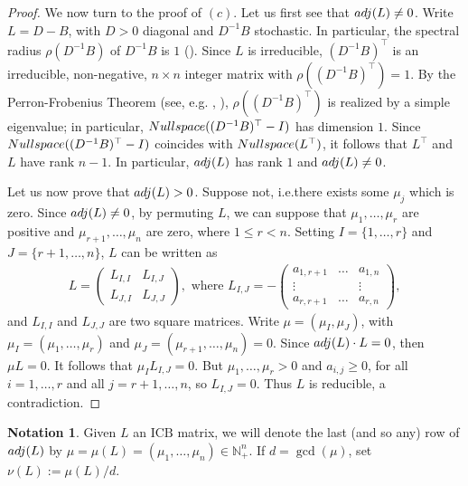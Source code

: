 \documentclass[10pt]{amsart}
\newcommand{\eg}{e.g.}
\newcommand{\ie}{i.e.}
\newcommand{\mbn}{\mbox{$\mathbb{N}$}}
\newcommand{\icb}{\mbox{$\mathrm{ICB}$}}
\newcommand{\I}{\mbox{${\rm I}$}}
\newcommand{\nulls}{\mbox{${\rm Nullspace}$}}
\newcommand{\adj}{\mbox{${\rm adj}$}}
\theoremstyle{definition}
\newtheorem{notation}[cdrthm]{Notation}
\theoremstyle{remark}
\begin{document}
\begin{proof}
We now turn to the proof of $(c)$. Let us first see that $\adj(L)\neq
0$. Write $L=D-B$, with $D>0$ diagonal and $D^{-1}B$ stochastic. In
particular, the spectral radius $\rho(D^{-1}B)$ of $D^{-1}B$ is $1$
(\cite[Chapter~XIII,~p.~83]{gantmacher}). Since $L$ is irreducible,
$(D^{-1}B)^{\top}$ is an irreducible, non-negative, $n\times n$
integer matrix with $\rho((D^{-1}B)^{\top})=1$. By the
Perron-Frobenius Theorem (see, \eg
\cite[Chapter~XIII,~p.~53]{gantmacher},
\cite[Theorem~8.8.1,~p.~178]{gr}), $\rho((D^{-1}B)^{\top})$ is
realized by a simple eigenvalue; in particular,
$\nulls((D^{-1}B)^{\top}-\I)$ has dimension $1$. Since
$\nulls((D^{-1}B)^{\top}-\I)$ coincides with $\nulls(L^{\top})$, it
follows that $L^{\top}$ and $L$ have rank $n-1$. In particular,
$\adj(L)$ has rank $1$ and $\adj(L)\neq 0$.

Let us now prove that $\adj(L)>0$. Suppose not, \ie there exists
some $\mu_j$ which is zero. Since $\adj(L)\neq 0$, by permuting $L$,
we can suppose that $\mu_1,\ldots ,\mu_r$ are positive and
$\mu_{r+1},\ldots ,\mu_n$ are zero, where $1\leq r<n$. Setting
$I=\{1,\ldots ,r\}$ and $J=\{r+1,\ldots ,n\}$, $L$ can be written as
\begin{eqnarray*}
L=\left(\begin{array}{cc}
L_{I,I}&L_{I,J}\\L_{J,I}&L_{J,J}
\end{array}\right),\mbox{ where }
L_{I,J}=-\left(\begin{array}{ccc}
a_{1,r+1}&\ldots &a_{1,n}\\\vdots&&\vdots\\a_{r,r+1}&\ldots &a_{r,n}
\end{array}\right),
\end{eqnarray*}
and $L_{I,I}$ and $L_{J,J}$ are two square matrices. Write
$\mu=(\mu_I,\mu_J)$, with $\mu_I=(\mu_1,\ldots ,\mu_r)$ and
$\mu_J=(\mu_{r+1},\ldots ,\mu_n)=0$. Since $\adj(L)\cdot L=0$, then
$\mu L=0$. It follows that $\mu_IL_{I,J}=0$. But $\mu_1,\ldots
,\mu_r>0$ and $a_{i,j}\geq 0$, for all $i=1,\ldots ,r$ and all
$j=r+1,\ldots, n$, so $L_{I,J}=0$. Thus $L$ is reducible, a
contradiction.
\end{proof}

\begin{notation}\label{vectornu}
Given $L$ an $\icb$ matrix, we will denote the last (and so any) row of
$\adj(L)$ by $\mu=\mu(L)=(\mu_1,\ldots ,\mu_n)\in\mbn^n_{+}$.  If
$d=\gcd(\mu)$, set $\nu(L):=\mu(L)/d$.
\end{notation}
\end{document}
